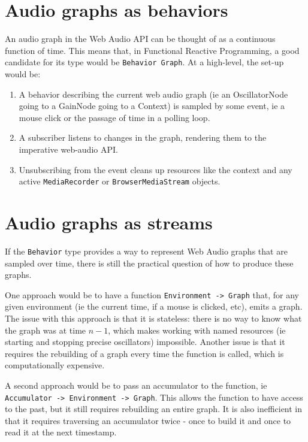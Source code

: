 \documentclass{sig-alternate}
\begin{document}
\begin{sloppypar}
  \section{Audio graphs as behaviors}

  An audio graph in the Web Audio API can be thought of as a continuous function of time. This means that, in Functional Reactive Programming, a good candidate for its type would be \texttt{Behavior Graph}. At a high-level, the set-up would be:
  
  \begin{enumerate}
    \item A behavior describing the current web audio graph (ie an OscillatorNode going to a GainNode going to a Context) is sampled by some event, ie a mouse click or the passage of time in a polling loop.
    \item A subscriber listens to changes in the graph, rendering them to the imperative web-audio API.
    \item Unsubscribing from the event cleans up resources like the context and any active \texttt{MediaRecorder} or \texttt{BrowserMediaStream} objects.
  \end{enumerate}

  \section{Audio graphs as streams}

  If the \texttt{Behavior} type provides a way to represent Web Audio graphs that are sampled over time, there is still the practical question of how to produce these graphs.

  One approach would be to have a function \texttt{Environment -> Graph} that, for any given environment (ie the current time, if a mouse is clicked, etc), emits a graph. The issue with this approach is that it is stateless: there is no way to know what the graph was at time $n-1$, which makes working with named resources (ie starting and stopping precise oscillators) impossible.  Another issue is that it requires the rebuilding of a graph every time the function is called, which is computationally expensive.

  A second approach would be to pass an accumulator to the function, ie \texttt{Accumulator -> Environment -> Graph}. This allows the function to have access to the past, but it still requires rebuilding an entire graph. It is also inefficient in that it requires traversing an accumulator twice - once to build it and once to read it at the next timestamp.
  

\end{sloppypar}
\end{document}
